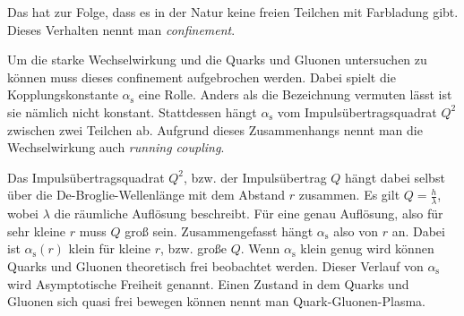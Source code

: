 Das hat zur Folge, dass es in der Natur keine freien Teilchen mit Farbladung gibt. Dieses Verhalten nennt man \textit{confinement}.

Um die starke Wechselwirkung und die Quarks und Gluonen untersuchen zu k\"onnen muss dieses confinement aufgebrochen werden. Dabei spielt die Kopplungskonstante $\alpha_\text{s}$ eine Rolle. Anders als die Bezeichnung vermuten l\"asst ist sie n\"amlich nicht konstant. Stattdessen h\"angt $\alpha_\text{s}$ vom Impulsübertragsquadrat $Q^{2}$ zwischen zwei Teilchen ab. Aufgrund dieses Zusammenhangs nennt man die Wechselwirkung auch \textit{running coupling}. 

Das Impulsübertragsquadrat $Q^{2}$, bzw. der Impulsübertrag $Q$ h\"angt dabei selbst \"uber die De-Broglie-Wellenl\"ange mit dem Abstand $r$ zusammen. Es gilt $Q = \frac{h}{\lambda}$, wobei $\lambda$ die r\"aumliche Aufl\"osung beschreibt. F\"ur eine genau Aufl\"osung, also f\"ur  sehr kleine $r$ muss $Q$ gro{\ss} sein.
Zusammengefasst h\"angt $\alpha_\text{s}$ also von $r$ an. Dabei ist $\alpha_\text{s}(r)$ klein f\"ur kleine $r$, bzw. gro{\ss}e $Q$.
Wenn $\alpha_\text{s}$ klein genug wird k\"onnen Quarks und Gluonen theoretisch frei beobachtet werden. Dieser Verlauf von $\alpha_\text{s}$ wird Asymptotische Freiheit genannt. Einen Zustand in dem Quarks und Gluonen sich quasi frei bewegen k\"onnen nennt man Quark-Gluonen-Plasma.